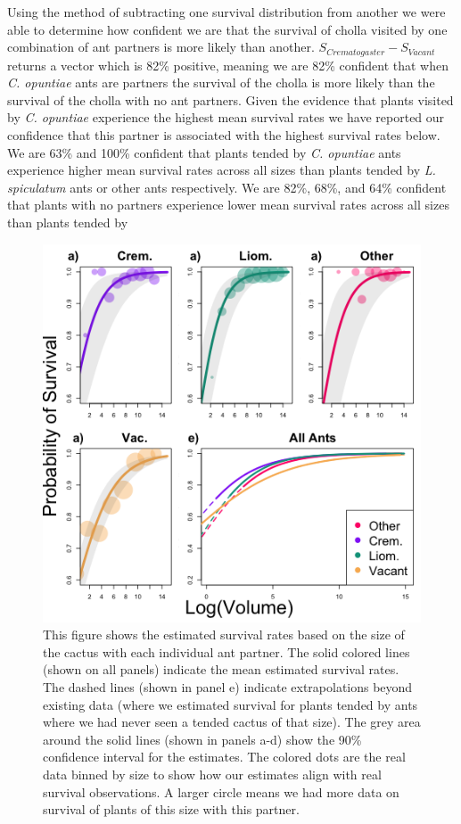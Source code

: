 \documentclass[11pt]{article}
\begin{document}
Using the method of subtracting one survival distribution from another we were able to determine how confident we are that the survival of cholla visited by one combination of ant partners is more likely than another. 
$S_{Crematogaster} - S_{Vacant}$ returns a vector which is 82\% positive, meaning we are 82\% confident that when \textit{C. opuntiae} ants are partners the survival of the cholla is more likely than the survival of the cholla with no ant partners.
Given the evidence that plants visited by \textit{C. opuntiae} experience the highest mean survival rates we have reported our confidence that this partner is associated with the highest survival rates below. 
We are 63\% and 100\% confident that plants tended by \textit{C. opuntiae} ants experience higher mean survival rates across all sizes than plants tended by \textit{L. spiculatum} ants or other ants respectively.
We are 82\%, 68\%, and 64\% confident that plants with no partners experience lower mean survival rates across all sizes than plants tended by 

\begin{figure}[H]
	\includegraphics[width=0.95\linewidth]{Figures/SurvivalPlot.png}
	\caption{This figure shows the estimated survival rates based on the size of the cactus with each individual ant partner. The solid colored lines (shown on all panels) indicate the mean estimated survival rates. The dashed lines (shown in panel e) indicate extrapolations beyond existing data (where we estimated survival for plants tended by ants where we had never seen a tended cactus of that size). The grey area around the solid lines (shown in panels a-d) show the 90\% confidence interval for the estimates. The colored dots are the real data binned by size to show how our estimates align with real survival observations. A larger circle means we had more data on survival of plants of this size with this partner.}
	\label{fig:Surv}
\end{figure}
\end{document}
